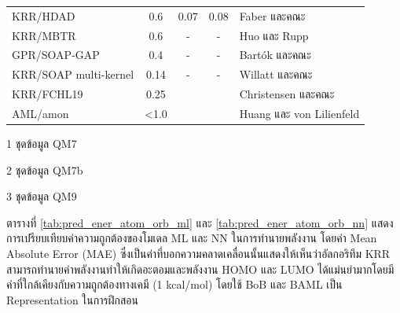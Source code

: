 \begin{table}[H]
\begin{threeparttable}[b]
\begin{tabular}{lcccl}
    KRR/HDAD\tnote{3} &0.6 &0.07 &0.08 &Faber และคณะ\autocite{faber2017} \\
    KRR/MBTR\tnote{2} &0.6 &- &- &Huo และ Rupp\autocite{huo2022} \\
    GPR/SOAP-GAP\tnote{2} &0.4 &- &- &Bart\'{o}k และคณะ\autocite{bartok2017} \\
    KRR/SOAP multi-kernel\tnote{3} &0.14 &- &- &Willatt และคณะ\autocite{willatt2018} \\
    KRR/FCHL19\tnote{3} &0.25 & & &Christensen และคณะ\autocite{christensen2020} \\
    AML/amon\tnote{3} &<1.0 & & &Huang และ von Lilienfeld\autocite{huang2020} \\
    \bottomrule
    \end{tabular}
    \begin{tablenotes}
        \item [1]ชุดข้อมูล QM7
        \item [2]ชุดข้อมูล QM7b
        \item [3]ชุดข้อมูล QM9
      \end{tablenotes}
    \end{threeparttable}
\end{table}

ตารางที่ \ref{tab:pred_ener_atom_orb_ml} และ \ref{tab:pred_ener_atom_orb_nn} แสดงการเปรียบเทียบค่าความถูกต้องของโมเดล
ML และ NN ในการทำนายพลังงาน โดยค่า Mean Absolute Error (MAE) ซึ่งเป็นค่าที่บอกความคลาดเคลื่อนนั้นแสดงให้เห็นว่าอัลกอริทึม KRR 
สามารถทำนายค่าพลังงานทำให้เกิดอะตอมและพลังงาน HOMO และ LUMO ได้แม่นยำมากโดยมีค่าที่ใกล้เคียงกับความถูกต้องทางเคมี (1 kcal/mol) 
โดยใช้ BoB\autocite{huang2016} และ BAML\autocite{faber2017} เป็น Representation ในการฝึกสอน

